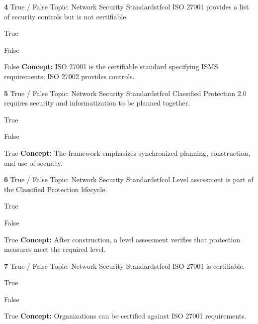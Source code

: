 \documentclass[10pt,a4paper]{article}
\begin{document}
\begin{qcard}{\color{white}\textbf{4} \hfill \small True / False \textbar{} Topic: Network Security Standards}{tfcol}
ISO 27001 provides a list of security controls but is not certifiable.

\begin{qoptions}
\item True
\item False
\end{qoptions}
\begin{explainbox}{False}
\textbf{Concept:} ISO 27001 is the certifiable standard specifying ISMS requirements; ISO 27002 provides controls.
\end{explainbox}
\end{qcard}

\begin{qcard}{\color{white}\textbf{5} \hfill \small True / False \textbar{} Topic: Network Security Standards}{tfcol}
Classified Protection 2.0 requires security and informatization to be planned together.

\begin{qoptions}
\item True
\item False
\end{qoptions}
\begin{explainbox}{True}
\textbf{Concept:} The framework emphasizes synchronized planning, construction, and use of security.
\end{explainbox}
\end{qcard}

\begin{qcard}{\color{white}\textbf{6} \hfill \small True / False \textbar{} Topic: Network Security Standards}{tfcol}
Level assessment is part of the Classified Protection lifecycle.

\begin{qoptions}
\item True
\item False
\end{qoptions}
\begin{explainbox}{True}
\textbf{Concept:} After construction, a level assessment verifies that protection measures meet the required level.
\end{explainbox}
\end{qcard}

\begin{qcard}{\color{white}\textbf{7} \hfill \small True / False \textbar{} Topic: Network Security Standards}{tfcol}
ISO 27001 is certifiable.

\begin{qoptions}
\item True
\item False
\end{qoptions}
\begin{explainbox}{True}
\textbf{Concept:} Organizations can be certified against ISO 27001 requirements.
\end{explainbox}
\end{qcard}
\end{document}
